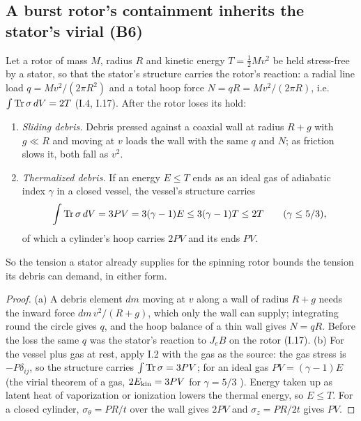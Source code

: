 \subsection{A burst rotor's containment inherits the stator's virial (B6)}
\begin{theorem}\label{thm:contain}
Let a rotor of mass $M$, radius $R$ and kinetic energy $T=\tfrac12Mv^2$ be held stress-free by a stator, so that the stator's structure carries
the rotor's reaction: a radial line load $q=Mv^2/(2\pi R^2)$ and a total hoop force $N=qR=Mv^2/(2\pi R)$, i.e.\ $\int\operatorname{Tr}\sigma\,dV=2T$ (I.4, I.17).
After the rotor loses its hold:
\begin{enumerate}
\item[(a)] \emph{Sliding debris.} Debris pressed against a coaxial wall at radius $R+g$ with $g\ll R$ and moving at $v$ loads the wall with the
same $q$ and $N$; as friction slows it, both fall as $v^2$.
\item[(b)] \emph{Thermalized debris.} If an energy $E\le T$ ends as an ideal gas of adiabatic index $\gamma$ in a closed vessel, the vessel's
structure carries
\begin{equation}
\int\operatorname{Tr}\sigma\,dV=3PV=3(\gamma-1)E\le3(\gamma-1)T\le2T\qquad(\gamma\le5/3),\label{eq:contain}
\end{equation}
of which a cylinder's hoop carries $2PV$ and its ends $PV$.
\end{enumerate}
So the tension a stator already supplies for the spinning rotor bounds the tension its debris can demand, in either form.
\end{theorem}
\begin{proof}
(a) A debris element $dm$ moving at $v$ along a wall of radius $R+g$ needs the inward force $dm\,v^2/(R+g)$, which only the wall can supply;
integrating round the circle gives $q$, and the hoop balance of a thin wall gives $N=qR$. Before the loss the same $q$ was the stator's reaction to
$J_eB$ on the rotor (I.17). (b) For the vessel plus gas at rest, apply I.2 with the gas as the source: the gas stress is $-P\delta_{ij}$, so the
structure carries $\int\operatorname{Tr}\sigma=3PV$; for an ideal gas $PV=(\gamma-1)E$ (the virial theorem of a gas, $2E_{\rm kin}=3PV$ for $\gamma=5/3$
\cite{virialgas}). Energy taken up as latent heat of vaporization or ionization lowers the thermal energy, so $E\le T$. For a closed
cylinder, $\sigma_\theta=PR/t$ over the wall gives $2PV$ and $\sigma_z=PR/2t$ gives $PV$.
\end{proof}
